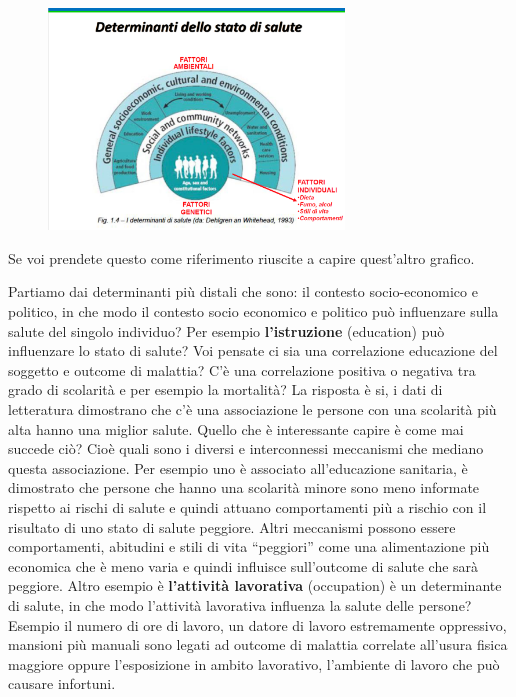 \begin{figure}[!ht]
\centering
	\includegraphics[width=0.7\textwidth]{17/image2.png}
	\end{figure}

Se voi prendete questo come riferimento riuscite a capire quest'altro
grafico.

Partiamo dai determinanti più distali che sono: il contesto
socio-economico e politico, in che modo il contesto socio economico e
politico può influenzare sulla salute del singolo individuo? Per esempio
\textbf{l'istruzione} (education) può influenzare lo stato di salute?
Voi pensate ci sia una correlazione educazione del soggetto e outcome di
malattia? C'è una correlazione positiva o negativa tra grado di
scolarità e per esempio la mortalità? La risposta è si, i dati di
letteratura dimostrano che c'è una associazione le persone con una
scolarità più alta hanno una miglior salute. Quello che è interessante
capire è come mai succede ciò? Cioè quali sono i diversi e interconnessi
meccanismi che mediano questa associazione. Per esempio uno è associato
all'educazione sanitaria, è dimostrato che persone che hanno una
scolarità minore sono meno informate rispetto ai rischi di salute e
quindi attuano comportamenti più a rischio con il risultato di uno stato
di salute peggiore. Altri meccanismi possono essere comportamenti,
abitudini e stili di vita ``peggiori'' come una alimentazione più
economica che è meno varia e quindi influisce sull'outcome di salute che
sarà peggiore. Altro esempio è \textbf{l'attività lavorativa}
(occupation) è un determinante di salute, in che modo l'attività
lavorativa influenza la salute delle persone? Esempio il numero di ore
di lavoro, un datore di lavoro estremamente oppressivo, mansioni più
manuali sono legati ad outcome di malattia correlate all'usura fisica
maggiore oppure l'esposizione in ambito lavorativo, l'ambiente di lavoro
che può causare infortuni.

